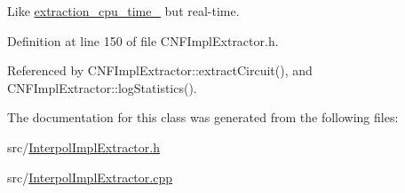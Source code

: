 Like \hyperlink{classCNFImplExtractor_ab8be06d42fd3c4b569ec22cfcf2f508e}{extraction\-\_\-cpu\-\_\-time\-\_\-} but real-\/time. 



Definition at line 150 of file C\-N\-F\-Impl\-Extractor.\-h.



Referenced by C\-N\-F\-Impl\-Extractor\-::extract\-Circuit(), and C\-N\-F\-Impl\-Extractor\-::log\-Statistics().



The documentation for this class was generated from the following files\-:\begin{DoxyCompactItemize}
\item 
src/\hyperlink{InterpolImplExtractor_8h}{Interpol\-Impl\-Extractor.\-h}\item 
src/\hyperlink{InterpolImplExtractor_8cpp}{Interpol\-Impl\-Extractor.\-cpp}\end{DoxyCompactItemize}
